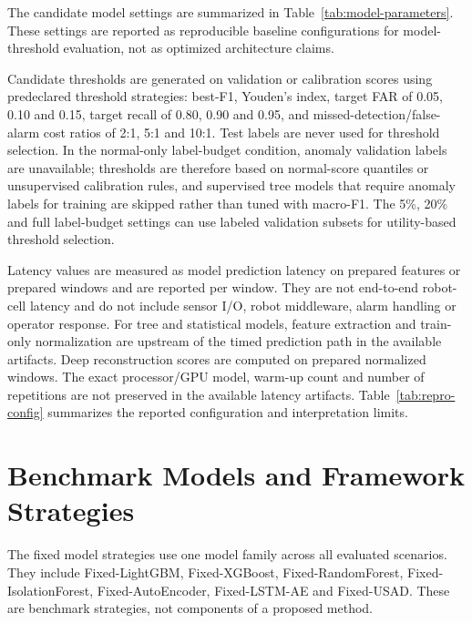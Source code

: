 The candidate model settings are summarized in Table~\ref{tab:model-parameters}. These settings are reported as reproducible baseline configurations for model-threshold evaluation, not as optimized architecture claims.



Candidate thresholds are generated on validation or calibration scores using predeclared threshold strategies: best-F1, Youden's index, target FAR of 0.05, 0.10 and 0.15, target recall of 0.80, 0.90 and 0.95, and missed-detection/false-alarm cost ratios of 2:1, 5:1 and 10:1. Test labels are never used for threshold selection. In the normal-only label-budget condition, anomaly validation labels are unavailable; thresholds are therefore based on normal-score quantiles or unsupervised calibration rules, and supervised tree models that require anomaly labels for training are skipped rather than tuned with macro-F1. The 5\%, 20\% and full label-budget settings can use labeled validation subsets for utility-based threshold selection.

Latency values are measured as model prediction latency on prepared features or prepared windows and are reported per window. They are not end-to-end robot-cell latency and do not include sensor I/O, robot middleware, alarm handling or operator response. For tree and statistical models, feature extraction and train-only normalization are upstream of the timed prediction path in the available artifacts. Deep reconstruction scores are computed on prepared normalized windows. The exact processor/GPU model, warm-up count and number of repetitions are not preserved in the available latency artifacts. Table~\ref{tab:repro-config} summarizes the reported configuration and interpretation limits.



\section{Benchmark Models and Framework Strategies}



The fixed model strategies use one model family across all evaluated scenarios. They include Fixed-\allowbreak LightGBM, Fixed-\allowbreak XGBoost, Fixed-\allowbreak RandomForest, Fixed-\allowbreak IsolationForest, Fixed-\allowbreak AutoEncoder, Fixed-\allowbreak LSTM-\allowbreak AE and Fixed-\allowbreak USAD. These are benchmark strategies, not components of a proposed method.



